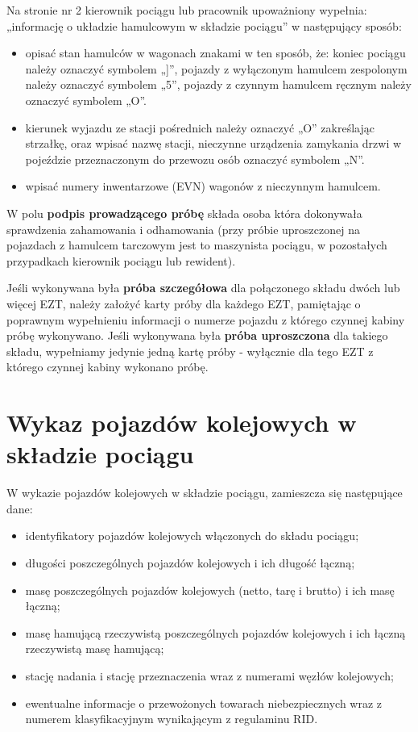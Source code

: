 Na stronie nr 2 kierownik pociągu lub pracownik upoważniony wypełnia: „informację o układzie hamulcowym w składzie pociągu” w następujący sposób:
\begin{itemize}
	\item opisać stan hamulców w wagonach znakami w ten sposób, że: koniec pociągu należy oznaczyć symbolem „]”,
	pojazdy z wyłączonym hamulcem zespolonym należy oznaczyć symbolem „5”,
	pojazdy z czynnym hamulcem ręcznym należy oznaczyć symbolem „O”.
	\item kierunek wyjazdu ze stacji pośrednich należy oznaczyć „O” zakreślając strzałkę, oraz wpisać nazwę stacji, nieczynne urządzenia zamykania drzwi w pojeździe przeznaczonym do 	przewozu osób oznaczyć symbolem „N”.
	\item wpisać numery inwentarzowe (EVN) wagonów z nieczynnym hamulcem.
\end{itemize}

W polu \textbf{podpis prowadzącego próbę} składa osoba która dokonywała sprawdzenia zahamowania i odhamowania (przy próbie uproszczonej na pojazdach z hamulcem tarczowym jest to maszynista pociągu, w pozostałych przypadkach kierownik pociągu lub rewident). 

Jeśli wykonywana była \textbf{próba szczegółowa} dla połączonego składu dwóch lub więcej EZT, należy założyć karty próby dla każdego EZT, pamiętając o poprawnym wypełnieniu informacji o numerze pojazdu z którego czynnej kabiny próbę wykonywano. Jeśli wykonywana była \textbf{próba uproszczona} dla takiego składu, wypełniamy jedynie jedną kartę próby - wyłącznie dla tego EZT z którego czynnej kabiny wykonano próbę.

\section{Wykaz pojazdów kolejowych w składzie pociągu}
W wykazie pojazdów kolejowych w składzie pociągu, zamieszcza się następujące dane:

\begin{itemize}
\item identyfikatory pojazdów kolejowych włączonych do składu pociągu;
\item długości poszczególnych pojazdów kolejowych i ich długość łączną;
\item masę poszczególnych pojazdów kolejowych (netto, tarę i brutto) i ich masę łączną;
\item masę hamującą rzeczywistą poszczególnych pojazdów kolejowych i ich łączną rzeczywistą masę hamującą;
\item stację nadania i stację przeznaczenia wraz z numerami węzłów kolejowych;
\item ewentualne informacje o przewożonych towarach niebezpiecznych wraz z numerem klasyfikacyjnym wynikającym z regulaminu RID.
\end{itemize}


